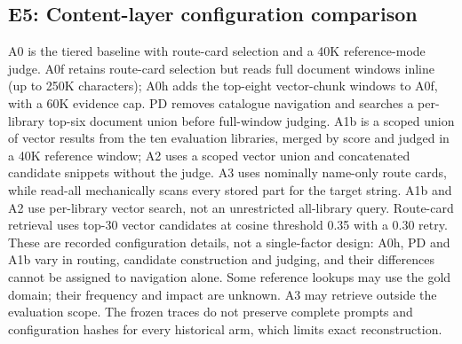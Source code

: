 \subsection{E5: Content-layer configuration comparison}
\label{sec:ladder-opt}
A0 is the tiered baseline with route-card selection and a 40K reference-mode
judge. A0f retains route-card selection but reads full document windows inline
(up to 250K characters); A0h adds the top-eight vector-chunk windows to A0f,
with a 60K evidence cap. PD removes catalogue navigation and searches a
per-library top-six document union before full-window judging. A1b is a
scoped union of vector results from the ten evaluation libraries, merged by
score and judged in a 40K reference window; A2 uses a scoped vector union and
concatenated candidate snippets without the judge. A3 uses nominally name-only route cards, while read-all mechanically
scans every stored part for the target string. A1b and A2 use per-library
vector search, not an unrestricted all-library query. Route-card retrieval
uses top-30 vector candidates at cosine threshold 0.35 with a 0.30 retry.
These are recorded configuration details, not a single-factor design: A0h,
PD and A1b vary in routing, candidate construction and judging, and their
differences cannot be assigned to navigation alone. Some reference lookups
may use the gold domain; their frequency and impact are unknown. A3 may
retrieve outside the evaluation scope. The frozen traces do not preserve
complete prompts and configuration hashes for every historical arm, which
limits exact reconstruction.

